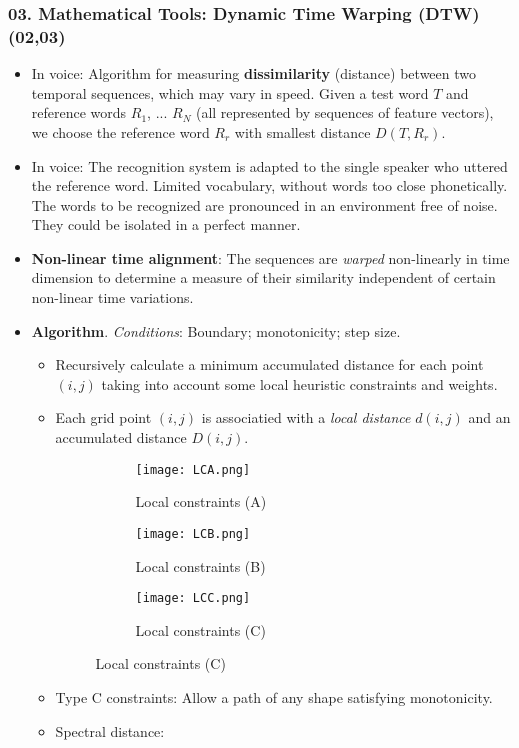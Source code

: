\documentclass[a4paper]{article}
\begin{document}
    \subsubsection*{03. Mathematical Tools: Dynamic Time Warping (DTW) (02,03)}
      \begin{itemize}
        \item In voice: Algorithm for measuring \textbf{dissimilarity} (distance) between two temporal sequences, which may vary in speed. Given a test word $T$ and reference words $R_1$, ... $R_N$ (all represented by sequences of feature vectors), we choose the reference word $R_r$ with smallest distance $D(T,R_r)$.
        \item In voice: The recognition system is adapted to the single speaker who uttered the reference word. Limited vocabulary, without words too close phonetically. The words to be recognized are pronounced in an environment free of noise. They could be isolated in a perfect manner.
        \item \textbf{Non-linear time alignment}: The sequences are \emph{warped} non-linearly in time dimension to determine a measure of their similarity independent of certain non-linear time variations.
        \item \textbf{Algorithm}. \emph{Conditions}: Boundary; monotonicity; step size.
        \begin{itemize}
          \item Recursively calculate a minimum accumulated distance for each point $(i, j)$ taking into account some local heuristic constraints and weights.
          \item Each grid point $(i,j)$ is associatied with a \emph{local distance} $d(i,j)$ and an accumulated distance $D(i,j)$.
          \begin{figure}[htp]
            \centering
            \begin{subfigure}{.32\textwidth}
              \centering
              \texttt{[image: LCA.png]}
              \caption{Local constraints (A)}
              \label{fig:lca}
            \end{subfigure}%
            \hfill
            \begin{subfigure}{.32\textwidth}
              \centering
              \texttt{[image: LCB.png]}
              \caption{Local constraints (B)}
              \label{fig:lcb}
            \end{subfigure}
            \hfill
            \begin{subfigure}{.29\textwidth}
              \centering
              \texttt{[image: LCC.png]}
              \caption{Local constraints (C)}
              \label{fig:lcc}
            \end{subfigure}
          \end{figure}
          \item Type C constraints: Allow a path of any shape satisfying monotonicity.
          \item Spectral distance: 
        \end{itemize}
      \end{itemize}
\end{document}
